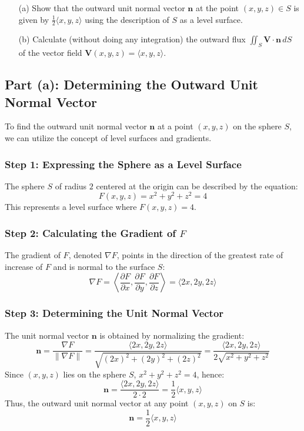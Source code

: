 \documentclass[11pt]{article}
\begin{document}
\begin{enumerate}
    \item[(a)] Show that the outward unit normal vector \( \mathbf{n} \) at the point \( (x,y,z) \in S \) is given by \( \frac{1}{2}\langle x, y, z \rangle \) using the description of \( S \) as a level surface.

    \item[(b)] Calculate (without doing any integration) the outward flux \( \iint_{S} \mathbf{V} \cdot \mathbf{n} \, dS \) of the vector field \( \mathbf{V}(x,y,z) = \langle x, y, z \rangle \).
\end{enumerate}

\newpage

\subsection{Part (a): Determining the Outward Unit Normal Vector}

To find the outward unit normal vector \( \mathbf{n} \) at a point \( (x,y,z) \) on the sphere \( S \), we can utilize the concept of level surfaces and gradients.

\subsubsection*{Step 1: Expressing the Sphere as a Level Surface}

The sphere \( S \) of radius \( 2 \) centered at the origin can be described by the equation:
\[
F(x, y, z) = x^2 + y^2 + z^2 = 4
\]
This represents a level surface where \( F(x, y, z) = 4 \).

\subsubsection*{Step 2: Calculating the Gradient of \( F \)}

The gradient of \( F \), denoted \( \nabla F \), points in the direction of the greatest rate of increase of \( F \) and is normal to the surface \( S \):
\[
\nabla F = \left\langle \frac{\partial F}{\partial x}, \frac{\partial F}{\partial y}, \frac{\partial F}{\partial z} \right\rangle = \langle 2x, 2y, 2z \rangle
\]

\subsubsection*{Step 3: Determining the Unit Normal Vector}

The unit normal vector \( \mathbf{n} \) is obtained by normalizing the gradient:
\[
\mathbf{n} = \frac{\nabla F}{\|\nabla F\|} = \frac{\langle 2x, 2y, 2z \rangle}{\sqrt{(2x)^2 + (2y)^2 + (2z)^2}} = \frac{\langle 2x, 2y, 2z \rangle}{2\sqrt{x^2 + y^2 + z^2}}
\]
Since \( (x, y, z) \) lies on the sphere \( S \), \( x^2 + y^2 + z^2 = 4 \), hence:
\[
\mathbf{n} = \frac{\langle 2x, 2y, 2z \rangle}{2 \cdot 2} = \frac{1}{2} \langle x, y, z \rangle
\]
Thus, the outward unit normal vector at any point \( (x,y,z) \) on \( S \) is:
\[
\boxed{ \mathbf{n} = \frac{1}{2} \langle x, y, z \rangle }
\]
\end{document}
